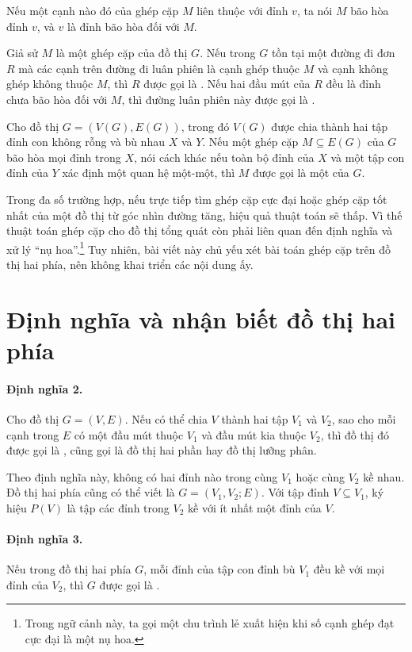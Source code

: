 \documentclass[11pt]{article}
\begin{document}
Nếu một cạnh nào đó của ghép cặp \(M\) liên thuộc với đỉnh \(v\), ta nói
\(M\) bão hòa đỉnh \(v\), và \(v\) là đỉnh bão hòa đối với \(M\).

Giả sử \(M\) là một ghép cặp của đồ thị \(G\). Nếu trong \(G\) tồn tại một
đường đi đơn \(R\) mà các cạnh trên đường đi luân phiên là cạnh ghép thuộc
\(M\) và cạnh không ghép không thuộc \(M\), thì \(R\) được gọi là
. Nếu hai đầu mút của \(R\) đều là đỉnh chưa bão hòa
đối với \(M\), thì đường luân phiên này được gọi là .

Cho đồ thị \(G=(V(G),E(G))\), trong đó \(V(G)\) được chia thành hai tập đỉnh
con không rỗng và bù nhau \(X\) và \(Y\). Nếu một ghép cặp
\(M\subseteq E(G)\) của \(G\) bão hòa mọi đỉnh trong \(X\), nói cách khác
nếu toàn bộ đỉnh của \(X\) và một tập con đỉnh của \(Y\) xác định một quan
hệ một-một, thì \(M\) được gọi là một  của \(G\).

Trong đa số trường hợp, nếu trực tiếp tìm ghép cặp cực đại hoặc ghép cặp tốt
nhất của một đồ thị từ góc nhìn đường tăng, hiệu quả thuật toán sẽ thấp. Vì
thế thuật toán ghép cặp cho đồ thị tổng quát còn phải liên quan đến định
nghĩa và xử lý ``nụ hoa''.\footnote{Trong ngữ cảnh này, ta gọi một chu trình
lẻ xuất hiện khi số cạnh ghép đạt cực đại là một nụ hoa.} Tuy nhiên, bài
viết này chủ yếu xét bài toán ghép cặp trên đồ thị hai phía, nên không khai
triển các nội dung ấy.

\section{Định nghĩa và nhận biết đồ thị hai phía}

\paragraph{Định nghĩa 2.}
Cho đồ thị \(G=(V,E)\). Nếu có thể chia \(V\) thành hai tập \(V_1\) và
\(V_2\), sao cho mỗi cạnh trong \(E\) có một đầu mút thuộc \(V_1\) và đầu
mút kia thuộc \(V_2\), thì đồ thị đó được gọi là ,
cũng gọi là đồ thị hai phần hay đồ thị lưỡng phân.

Theo định nghĩa này, không có hai đỉnh nào trong cùng \(V_1\) hoặc cùng
\(V_2\) kề nhau. Đồ thị hai phía cũng có thể viết là
\(G=(V_1,V_2;E)\). Với tập đỉnh \(V\subseteq V_1\), ký hiệu \(P(V)\) là tập
các đỉnh trong \(V_2\) kề với ít nhất một đỉnh của \(V\).

\paragraph{Định nghĩa 3.}
Nếu trong đồ thị hai phía \(G\), mỗi đỉnh của tập con đỉnh bù \(V_1\) đều kề
với mọi đỉnh của \(V_2\), thì \(G\) được gọi là .
\end{document}
